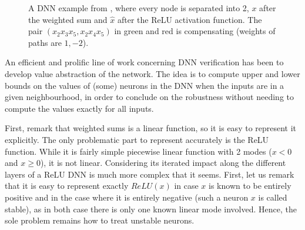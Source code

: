 \documentclass{llncs}
\begin{document}
\begin{figure}[t!]
		\caption{A DNN example from \cite{kpoly}, where every node is separated into 2, $x$ after the weighted sum and $\hat{x}$ after the ReLU activation function. The pair $(x_2 x_3 x_5,x_2 x_4 x_5)$ in green and red is compensating (weights of paths are $1,-2$).}
		\label{fig1}
	\end{figure}
	
An efficient and prolific line of work concerning DNN verification has been to develop value abstraction of the network. The idea is to compute upper and lower bounds on the values of (some) neurons in the DNN when the inputs are in a given neighbourhood, in order to conclude on the robustness without needing to compute the values exactly for all inputs.

First, remark that weighted sums is a linear function, so it is easy to represent it explicitly. The only problematic part to represent accurately is the ReLU function. While it is fairly simple piecewise linear function with 2 modes ($x<0$ and $x \geq 0$), it is not linear. Considering its iterated impact along the different layers of a ReLU DNN is much more complex that it seems. First, let us remark that it is easy to represent exactly $ReLU(x)$
in case $x$ is known to be entirely positive and in the case where it is entirely negative
(such a neuron $x$ is called stable), as in both case there is only one known linear mode involved. Hence, the sole problem remains how to treat unstable neurons.
\end{document}
